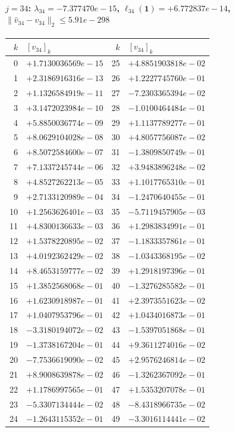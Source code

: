 \paragraph{$j = 34$: $\lambda_{34} = -7.377470e-15$, \quad $\ell_{34}(\mathbf{1}) = +6.772837e-14$, \quad $\|\hat{v}_{34} - v_{34}\|_2 \leq 5.91e-298$}
\begin{center}
{\footnotesize
\begin{tabular}{r@{\;\;}l@{\quad}r@{\;\;}l}
\toprule
$k$ & $[v_{34}]_k$ & $k$ & $[v_{34}]_k$ \\
\midrule
0 & $+1.7130036569e-15$ & 25 & $+4.8851903818e-02$ \\
1 & $+2.3186916316e-13$ & 26 & $+1.2227745760e-01$ \\
2 & $+1.1326584919e-11$ & 27 & $-7.2303365394e-02$ \\
3 & $+3.1472023984e-10$ & 28 & $-1.0100464484e-01$ \\
4 & $+5.8850036774e-09$ & 29 & $+1.1137789277e-01$ \\
5 & $+8.0629104028e-08$ & 30 & $+4.8057756087e-02$ \\
6 & $+8.5072584600e-07$ & 31 & $-1.3809850749e-01$ \\
7 & $+7.1337245744e-06$ & 32 & $+3.9483896248e-02$ \\
8 & $+4.8527262213e-05$ & 33 & $+1.1017765310e-01$ \\
9 & $+2.7133120989e-04$ & 34 & $-1.2470640455e-01$ \\
10 & $+1.2563626401e-03$ & 35 & $-5.7119457905e-03$ \\
11 & $+4.8300136633e-03$ & 36 & $+1.2983834991e-01$ \\
12 & $+1.5378220895e-02$ & 37 & $-1.1833357861e-01$ \\
13 & $+4.0192362429e-02$ & 38 & $-1.0343368195e-02$ \\
14 & $+8.4653159777e-02$ & 39 & $+1.2918197396e-01$ \\
15 & $+1.3852568068e-01$ & 40 & $-1.3276285582e-01$ \\
16 & $+1.6230918987e-01$ & 41 & $+2.3973551623e-02$ \\
17 & $+1.0407953796e-01$ & 42 & $+1.0434016873e-01$ \\
18 & $-3.3180194072e-02$ & 43 & $-1.5397051868e-01$ \\
19 & $-1.3738167204e-01$ & 44 & $+9.3611274016e-02$ \\
20 & $-7.7536619090e-02$ & 45 & $+2.9576246814e-02$ \\
21 & $+8.9008639878e-02$ & 46 & $-1.3262367092e-01$ \\
22 & $+1.1786997565e-01$ & 47 & $+1.5353207078e-01$ \\
23 & $-5.3307134444e-02$ & 48 & $-8.4318966735e-02$ \\
24 & $-1.2643115352e-01$ & 49 & $-3.3016114441e-02$ \\
\bottomrule
\end{tabular}
}
\end{center}

